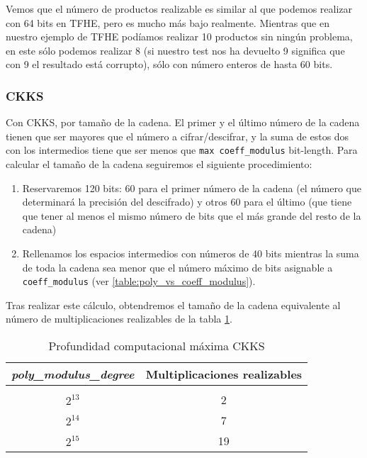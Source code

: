 Vemos que el número de productos realizable es similar al que podemos realizar con 64 bits en TFHE, pero es mucho más bajo realmente. Mientras que en nuestro ejemplo de TFHE podíamos realizar 10 productos sin ningún problema, en este sólo podemos realizar 8 (si nuestro test nos ha devuelto 9 significa que con 9 el resultado está corrupto), sólo con número enteros de hasta 60 bits.

\subsubsection{CKKS}

Con CKKS, por tamaño de la cadena. El primer y el último número de la cadena tienen que ser mayores que el número a cifrar/descifrar, y la suma de estos dos con los intermedios tiene que ser menos que  \verb|max coeff_modulus| bit-length. Para calcular el tamaño de la cadena seguiremos el siguiente procedimiento:

\begin{enumerate}
    \item Reservaremos 120 bits: 60 para el primer número de la cadena (el número que determinará la precisión del descifrado) y otros 60 para el último (que tiene que tener al menos el mismo número de bits que el más grande del resto de la cadena)
    \item Rellenamos los espacios intermedios con números de 40 bits mientras la suma de toda la cadena sea menor que el número máximo de bits asignable a \verb|coeff_modulus| (ver \ref{table:poly_vs_coeff_modulus}).
\end{enumerate}

Tras realizar este cálculo, obtendremos el tamaño de la cadena equivalente al número de multiplicaciones realizables de la tabla \ref{table:seal_ckks_mult_depth}.

\begin{table}[]
    \centering
    \begin{tabular}{c c }
        \textit{poly\_modulus\_degree}   & Multiplicaciones realizables  \\
        \hline \hline \\
        $2^{13}$  & 2 \\
        $2^{14}$  & 7 \\
        $2^{15}$  & 19
    \end{tabular}
    \caption{Profundidad computacional máxima CKKS}
    \label{table:seal_ckks_mult_depth}
\end{table}

